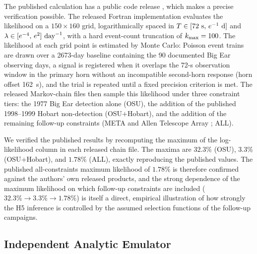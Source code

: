 \documentclass[twocolumn]{aastex701}
\newcommand{\kmax}{k_{\rm max}}
\begin{document}
The published calculation has a public code release \citep{kipping2022code}, which makes a precise verification possible. The released Fortran implementation \citep[{\tt wow.f90};][]{kipping2022code} evaluates the likelihood on a $150\times160$ grid, logarithmically spaced in $T\in[72~{\rm s},\,e^{-1}~{\rm d}]$ and $\lambda\in[e^{-4},\,e^{2}]~{\rm day}^{-1}$, with a hard event-count truncation of $\kmax=100$. The likelihood at each grid point is estimated by Monte Carlo: Poisson event trains are drawn over a 2673-day baseline containing the 90 documented Big Ear observing days, a signal is registered when it overlaps the 72-s observation window in the primary horn without an incompatible second-horn response (horn offset 162~s), and the trial is repeated until a fixed precision criterion is met. The released Markov-chain files then sample this likelihood under three constraint tiers: the 1977 Big Ear detection alone (OSU), the addition of the published 1998--1999 Hobart non-detection (OSU$+$Hobart), and the addition of the remaining follow-up constraints (META and Allen Telescope Array \citep{harp2020}; ALL).

We verified the published results by recomputing the maximum of the log-likelihood column in each released chain file. The maxima are $32.3\%$ (OSU), $3.3\%$ (OSU$+$Hobart), and $1.78\%$ (ALL), exactly reproducing the published values. The published all-constraints maximum likelihood of $1.78\%$ is therefore confirmed against the authors' own released products, and the strong dependence of the maximum likelihood on which follow-up constraints are included ($32.3\%\rightarrow3.3\%\rightarrow1.78\%$) is itself a direct, empirical illustration of how strongly the H5 inference is controlled by the assumed selection functions of the follow-up campaigns.

\subsection{Independent Analytic Emulator}
\label{sec:h5_emulator}
\end{document}
